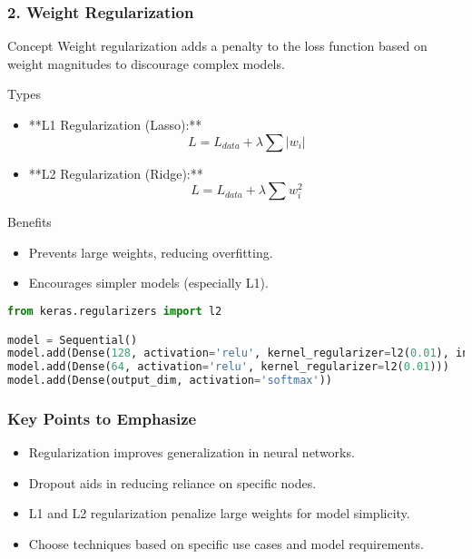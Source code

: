 \documentclass[aspectratio=169]{beamer}
\begin{document}
\begin{frame}[fragile]
    \frametitle{2. Weight Regularization}
    \begin{block}{Concept}
        Weight regularization adds a penalty to the loss function based on weight magnitudes to discourage complex models.
    \end{block}
    
    \begin{block}{Types}
        \begin{itemize}
            \item **L1 Regularization (Lasso):** 
                \[
                L = L_{data} + \lambda \sum |w_i|
                \]
            \item **L2 Regularization (Ridge):**
                \[
                L = L_{data} + \lambda \sum w_i^2
                \]
        \end{itemize}
    \end{block}

    \begin{block}{Benefits}
        \begin{itemize}
            \item Prevents large weights, reducing overfitting.
            \item Encourages simpler models (especially L1).
        \end{itemize}
    \end{block}
    
    \begin{lstlisting}[language=Python]
from keras.regularizers import l2

model = Sequential()
model.add(Dense(128, activation='relu', kernel_regularizer=l2(0.01), input_shape=(input_dim,)))
model.add(Dense(64, activation='relu', kernel_regularizer=l2(0.01)))
model.add(Dense(output_dim, activation='softmax'))
    \end{lstlisting}
\end{frame}

\begin{frame}[fragile]
    \frametitle{Key Points to Emphasize}
    \begin{itemize}
        \item Regularization improves generalization in neural networks.
        \item Dropout aids in reducing reliance on specific nodes.
        \item L1 and L2 regularization penalize large weights for model simplicity.
        \item Choose techniques based on specific use cases and model requirements.
    \end{itemize}
\end{frame}
\end{document}
